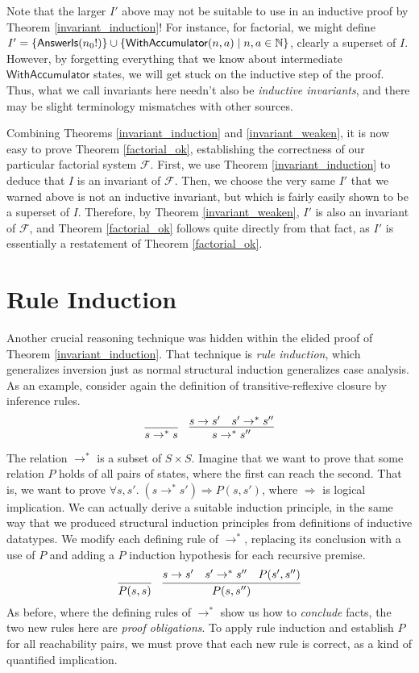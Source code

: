 \documentclass{amsbook}
\theoremstyle{definition}
\theoremstyle{remark}
\numberwithin{section}{chapter}
\numberwithin{equation}{chapter}
\begin{document}
Note that the larger $I'$ above may not be suitable to use in an inductive proof by Theorem \ref{invariant_induction}!
For instance, for factorial, we might define $I' = \mathcal \{\mathsf{AnswerIs}(n_0!)\} \cup \{\mathsf{WithAccumulator}(n, a) \mid n, a \in \mathbb N\}$, clearly a superset of $I$.
However, by forgetting everything that we know about intermediate $\mathsf{WithAccumulator}$ states, we will get stuck on the inductive step of the proof.
Thus, what we call invariants here needn't also be \emph{inductive invariants}, and there may be slight terminology mismatches with other sources.

Combining Theorems \ref{invariant_induction} and \ref{invariant_weaken}, it is now easy to prove Theorem \ref{factorial_ok}, establishing the correctness of our particular factorial system $\mathcal F$.
First, we use Theorem \ref{invariant_induction} to deduce that $I$ is an invariant of $\mathcal F$.
Then, we choose the very same $I'$ that we warned above is not an inductive invariant, but which is fairly easily shown to be a superset of $I$.
Therefore, by Theorem \ref{invariant_weaken}, $I'$ is also an invariant of $\mathcal F$, and Theorem \ref{factorial_ok} follows quite directly from that fact, as $I'$ is essentially a restatement of Theorem \ref{factorial_ok}.

\section{Rule Induction}

Another crucial reasoning technique was hidden within the elided proof of Theorem \ref{invariant_induction}.
That technique is \emph{rule induction}, which generalizes inversion just as normal structural induction generalizes case analysis.
As an example, consider again the definition of transitive-reflexive closure by inference rules.
$$\infer{s \to^* s}{}
\quad \infer{s \to^* s''}{
  s \to s'
  & s' \to^* s''
}$$

The relation $\to^*$ is a subset of $S \times S$.
Imagine that we want to prove that some relation $P$ holds of all pairs of states, where the first can reach the second.
That is, we want to prove $\forall s, s'. \; (s \to^* s') \Rightarrow P(s, s')$, where $\Rightarrow$ is logical implication.
We can actually derive a suitable induction principle, in the same way that we produced structural induction principles from definitions of inductive datatypes.
We modify each defining rule of $\to^*$, replacing its conclusion with a use of $P$ and adding a $P$ induction hypothesis for each recursive premise.
$$\infer{P(s, s)}{}
\quad \infer{P(s, s'')}{
  s \to s'
  & s' \to^* s''
  & P(s', s'')
}$$
As before, where the defining rules of $\to^*$ show us how to \emph{conclude} facts, the two new rules here are \emph{proof obligations}.
To apply rule induction and establish $P$ for all reachability pairs, we must prove that each new rule is correct, as a kind of quantified implication.
\end{document}
